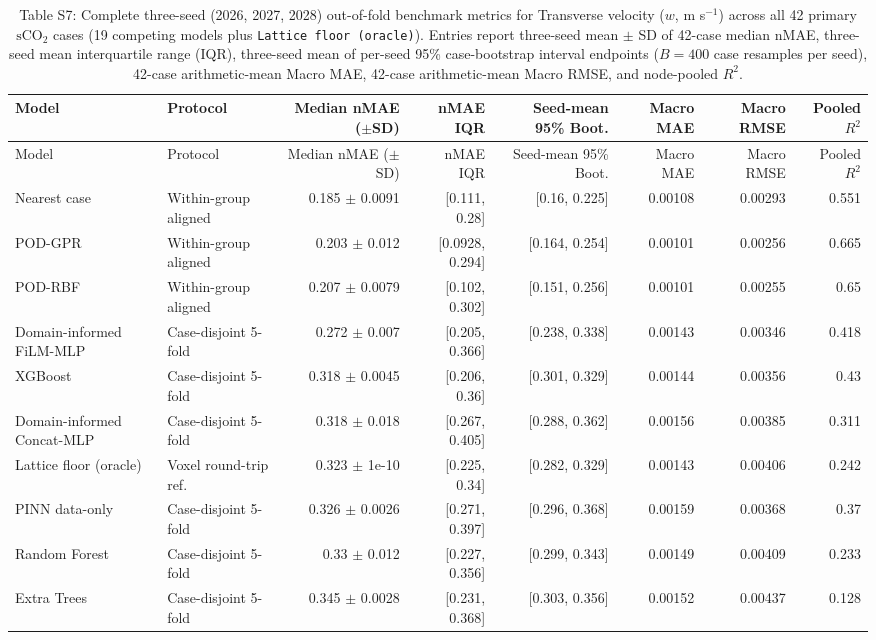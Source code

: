 \begin{landscape}\scriptsize
\begin{longtable}{p{3.8cm}p{2.9cm}rrrrrr}
\caption{Table S7: Complete three-seed (2026, 2027, 2028) out-of-fold benchmark metrics for Transverse velocity ($w$, m s$^{-1}$) across all 42 primary $\mathrm{sCO}_2$ cases (19 competing models plus \texttt{Lattice floor (oracle)}). Entries report three-seed mean $\pm$ SD of 42-case median nMAE, three-seed mean interquartile range (IQR), three-seed mean of per-seed 95\% case-bootstrap interval endpoints ($B=400$ case resamples per seed), 42-case arithmetic-mean Macro MAE, 42-case arithmetic-mean Macro RMSE, and node-pooled $R^2$.}\\
\toprule Model & Protocol & Median nMAE ($\pm$SD) & nMAE IQR & Seed-mean 95\% Boot. & Macro MAE & Macro RMSE & Pooled $R^2$\\
\midrule\endfirsthead
\toprule Model & Protocol & Median nMAE ($\pm$SD) & nMAE IQR & Seed-mean 95\% Boot. & Macro MAE & Macro RMSE & Pooled $R^2$\\
\midrule\endhead
Nearest case & Within-group aligned & 0.185 $\pm$ 0.0091 & [0.111, 0.28] & [0.16, 0.225] & 0.00108 & 0.00293 & 0.551 \\
POD-GPR & Within-group aligned & 0.203 $\pm$ 0.012 & [0.0928, 0.294] & [0.164, 0.254] & 0.00101 & 0.00256 & 0.665 \\
POD-RBF & Within-group aligned & 0.207 $\pm$ 0.0079 & [0.102, 0.302] & [0.151, 0.256] & 0.00101 & 0.00255 & 0.65 \\
Domain-informed FiLM-MLP & Case-disjoint 5-fold & 0.272 $\pm$ 0.007 & [0.205, 0.366] & [0.238, 0.338] & 0.00143 & 0.00346 & 0.418 \\
XGBoost & Case-disjoint 5-fold & 0.318 $\pm$ 0.0045 & [0.206, 0.36] & [0.301, 0.329] & 0.00144 & 0.00356 & 0.43 \\
Domain-informed Concat-MLP & Case-disjoint 5-fold & 0.318 $\pm$ 0.018 & [0.267, 0.405] & [0.288, 0.362] & 0.00156 & 0.00385 & 0.311 \\
Lattice floor (oracle) & Voxel round-trip ref. & 0.323 $\pm$ 1e-10 & [0.225, 0.34] & [0.282, 0.329] & 0.00143 & 0.00406 & 0.242 \\
PINN data-only & Case-disjoint 5-fold & 0.326 $\pm$ 0.0026 & [0.271, 0.397] & [0.296, 0.368] & 0.00159 & 0.00368 & 0.37 \\
Random Forest & Case-disjoint 5-fold & 0.33 $\pm$ 0.012 & [0.227, 0.356] & [0.299, 0.343] & 0.00149 & 0.00409 & 0.233 \\
Extra Trees & Case-disjoint 5-fold & 0.345 $\pm$ 0.0028 & [0.231, 0.368] & [0.303, 0.356] & 0.00152 & 0.00437 & 0.128 \\

\end{longtable}
\end{landscape}

